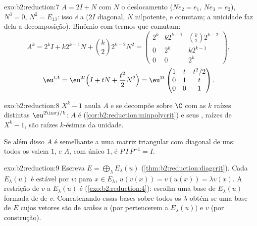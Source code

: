 \begin{solution}{exo:b2:reduction:7}
$A = 2I + N$ com $N$ o deslocamento ($N e_2 = e_1$, $Ne_3 = e_2$),
$N^3 = 0$, $N^2 = E_{13}$: isso \emph{é} a 
($2I$ diagonal, $N$ nilpotente, e comutam; a unicidade faz dela
a decomposição). Binômio com termos que comutam:
\[
A^k = 2^k I + k 2^{k-1} N + \binom k2 2^{k-2} N^2
= \begin{pmatrix}
2^k & k2^{k-1} & \binom k2 2^{k-2}\\
0 & 2^k & k2^{k-1}\\
0 & 0 & 2^k
\end{pmatrix},
\]
\[
\eu^{tA} = \eu^{2t}\Bigl(I + tN + \frac{t^2}{2}N^2\Bigr)
= \eu^{2t}\begin{pmatrix}
1 & t & t^2/2\\
0 & 1 & t\\
0 & 0 & 1
\end{pmatrix}.
\]
\end{solution}

\begin{solution}{exo:b2:reduction:8}
$X^k - 1$ anula $A$ e se decompõe sobre $\C$ com as $k$ raízes
distintas $\eu^{2\iu\pi j/k}$: $A$ é 
(\cref{cor:b2:reduction:minpolycrit}) e seus , raízes de
$X^k - 1$, são raízes $k$-ésimas da unidade.

Se além disso $A$ é semelhante a uma matriz triangular com diagonal
de uns: todos os  valem $1$, e $A$,  com
único  $1$, é $P\,I\,P^{-1} = I$.
\end{solution}

\begin{solution}{exo:b2:reduction:9}
Escreva $E = \bigoplus_\lambda E_\lambda(u)$
(\cref{thm:b2:reduction:diagcrit}). Cada $E_\lambda(u)$ é
estável por $v$: para $x \in E_\lambda$, $u(v(x)) = v(u(x)) = \lambda
v(x)$. A restrição de $v$ a $E_\lambda(u)$ é 
(\cref{exo:b2:reduction:4}): escolha uma base de $E_\lambda(u)$ formada
de  de $v$. Concatenando essas bases sobre todos os $\lambda$
obtém-se uma base de $E$ cujos vetores são  de \emph{ambos}
$u$ (por pertencerem a $E_\lambda(u)$) e $v$ (por construção).
\end{solution}

